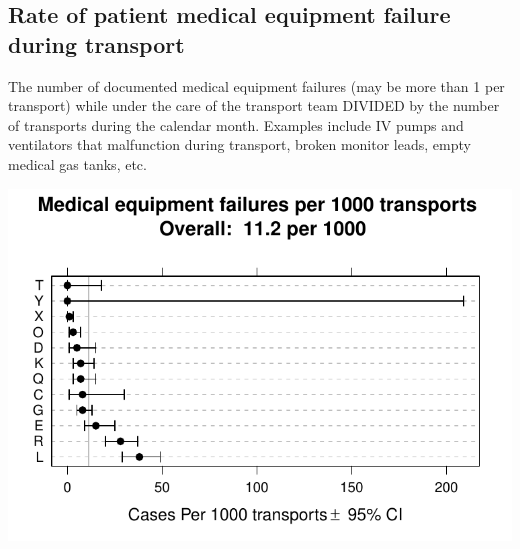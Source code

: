 \documentclass[twoside]{article}\usepackage[]{graphicx}\usepackage[]{color}
\makeatletter
\def\maxwidth{ %
  \ifdim\Gin@nat@width>\linewidth
    \linewidth
  \else
    \Gin@nat@width
  \fi
}
\newenvironment{knitrout}{}{} %
\makeatother
\begin{document}
\subsection{Rate of patient medical equipment failure during transport}
The number of documented medical equipment failures (may be more than 1 per transport) while under the care of the transport team DIVIDED by the number of transports during the calendar month. Examples include IV pumps and ventilators that malfunction during transport, broken monitor leads, empty medical gas tanks, etc.

\begin{center}
\begin{knitrout}
\color{fgcolor}
\includegraphics[width=\maxwidth]{figure/r_med_equip_failure} 

\end{knitrout}

\end{center}
\end{document}
